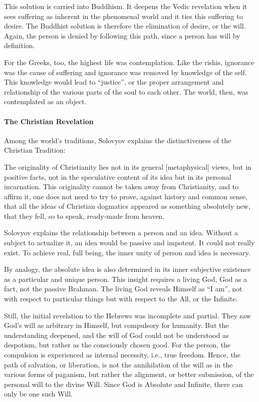 This solution is carried into Buddhism. It deepens the Vedic revelation when it sees suffering as inherent in the phenomenal world and it ties this suffering to desire. The Buddhist solution is therefore the elimination of desire, or the will. Again, the person is denied by following this path, since a person has will by definition.

For the Greeks, too, the highest life was contemplation. Like the rishis, ignorance was the cause of suffering and ignorance was removed by knowledge of the self. This knowledge would lead to “justice”, or the proper arrangement and relationship of the various parts of the soul to each other. The world, then, was contemplated as an object.

\paragraph{The Christian Revelation}
Among the world's traditions, Solovyov explains the distinctiveness of the Christian Tradition:

\begin{quotex}
The originality of Christianity lies not in its general [metaphysical] views, but in positive facts, not in the speculative content of its idea but in its personal incarnation. This originality cannot be taken away from Christianity, and to affirm it, one does not need to try to prove, against history and common sense, that all the ideas of Christian dogmatics appeared as something absolutely new, that they fell, so to speak, ready-made from heaven. 

\end{quotex}
Solovyov explains the relationship between a person and an idea. Without a subject to actualize it, an idea would be passive and impotent. It could not really exist. To achieve real, full being, the inner unity of person and idea is necessary.

By analogy, the absolute idea is also determined in its inner subjective existence as a particular and unique person. This insight requires a living God, God as a fact, not the passive Brahman. The living God reveals Himself as “I am”, not with respect to particular things but with respect to the All, or the Infinite.

Still, the initial revelation to the Hebrews was incomplete and partial. They saw God's will as arbitrary in Himself, but compulsory for humanity. But the understanding deepened, and the will of God could not be understood as despotism, but rather as the consciously chosen good. For the person, the compulsion is experienced as internal necessity, i.e., true freedom. Hence, the path of salvation, or liberation, is not the annihilation of the will as in the various forms of paganism, but rather the alignment, or better submission, of the personal will to the divine Will. Since God is Absolute and Infinite, there can only be one such Will.

